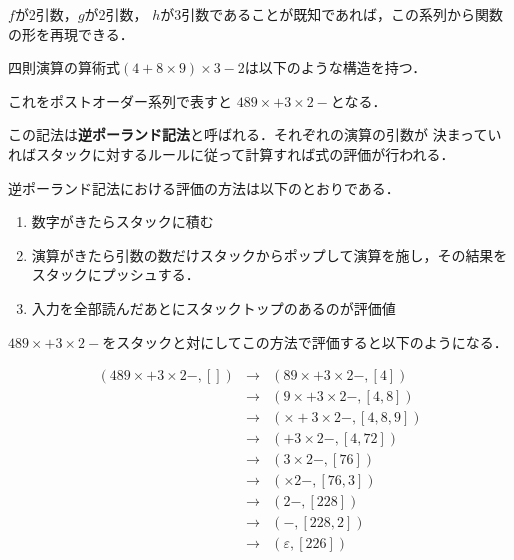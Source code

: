 \documentclass[a4j,dvipdfmx]{jbook}
\begin{document}
$f$が2引数，$g$が2引数，
$h$が3引数であることが既知であれば，この系列から関数の形を再現できる．

四則演算の算術式$(4+8\times 9)\times 3-2$は以下のような構造を持つ．
\begin{center}
\end{center}
  これをポストオーダー系列で表すと
  $489\times +3\times 2-$となる．

  この記法は{\bf 逆ポーランド記法}と呼ばれる．それぞれの演算の引数が
  決まっていればスタックに対するルールに従って計算すれば式の評価が行われる．

  逆ポーランド記法における評価の方法は以下のとおりである．
  \begin{enumerate}
    \item 数字がきたらスタックに積む
    \item 演算がきたら引数の数だけスタックからポップして演算を施し，その結果をスタックにプッシュする．
    \item 入力を全部読んだあとにスタックトップのあるのが評価値
  \end{enumerate}

  $489\times +3\times 2-$をスタックと対にしてこの方法で評価すると以下のようになる．

  \[\begin{array}{rcl}
    (489\times +3\times 2-,[]) & \rightarrow &(89\times +3\times 2-,[4])\\
    & \rightarrow & (9\times +3\times 2-,[4,8])\\
    & \rightarrow & (\times +3\times 2-,[4,8,9])\\
    & \rightarrow & (+3\times 2-,[4,72])\\
    & \rightarrow & (3\times 2-,[76])\\
    & \rightarrow & (\times 2-,[76,3])\\
    & \rightarrow & (2-,[228])\\
    & \rightarrow & (-,[228,2])\\
    & \rightarrow & (\varepsilon,[226])
  \end{array}\]
\end{document}
